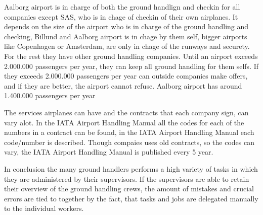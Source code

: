 Aalborg airport is in charge of both the ground handlign and checkin for all companies execpt SAS, who is in chage of checkin of their own airplanes. It depends on the size of the airport who is in charge of the ground handling and checking, Billund and Aalborg airport is in chage by them self, bigger airports like Copenhagen or Amsterdam, are only in chage of the runways and securety. For the rest they have other ground handling companies.
Until an airport exceeds 2.000.000 passengers per year, they can keep all ground handling for them selfs. If they exceeds 2.000.000 passengers per year can outside companies make offers, and if they are better, the airport cannot refuse.
Aalborg airport has around  1.400.000 passengers per year

The services airplanes can have and the contracts that each company sign, can vary alot. In the IATA Airport Handling Manual all the codes for each of the numbers in a contract can be found, in the IATA Airport Handling Manual each code/number is described. Though compaies uses old contracts, so the codes can vary, the IATA Airport Handling Manual is published every 5 year.

%

In conclusion the many ground handlers performs a high variety of tasks in which they are administered by their supervisors. If the supervisors are able to retain their overview of the ground handling crews, the amount of mistakes and crucial errors are tied to together by the fact, that tasks and jobs are delegated manually to the individual workers.
